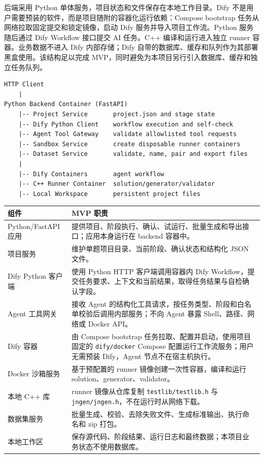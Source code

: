 \documentclass[UTF8,zihao=-4]{ctexart}
\begin{document}
后端采用 Python 单体服务，项目状态和文件保存在本地工作目录。Dify 不是用户需要预装的软件，而是项目随附的容器化运行依赖：Compose bootstrap 任务从网络拉取固定提交和锁定镜像，启动 Dify 服务并导入项目工作流。Python 服务随后通过 Dify Workflow 接口提交 AI 任务。C++ 编译和运行进入独立 runner 容器。业务数据不进入 Dify 内部存储；Dify 自带的数据库、缓存和队列作为其部署黑盒使用。该结构足以完成 MVP，同时避免为本项目另行引入数据库、缓存和独立任务队列。

\begin{lstlisting}
HTTP Client
    |
Python Backend Container (FastAPI)
    |-- Project Service       project.json and stage state
    |-- Dify Python Client    workflow execution and self-check
    |-- Agent Tool Gateway    validate allowlisted tool requests
    |-- Sandbox Service       create disposable runner containers
    |-- Dataset Service       validate, name, pair and export files
    |
    |-- Dify Containers       agent workflow
    |-- C++ Runner Container  solution/generator/validator
    |-- Local Workspace       persistent project files
\end{lstlisting}

\begin{longtable}{p{3.6cm}p{10.2cm}}
\toprule
组件 & MVP 职责 \\
\midrule
Python/FastAPI 应用 & 提供项目、阶段执行、确认、试运行、批量生成和导出接口；应用本身运行在 backend 容器中。 \\
项目服务 & 维护单题项目目录、当前阶段、确认状态和结构化 JSON 文件。 \\
Dify Python 客户端 & 使用 Python HTTP 客户端调用容器内 Dify Workflow，提交任务要求、上下文和当前结果，取得任务结果与自检确认字段。 \\
Agent 工具网关 & 接收 Agent 的结构化工具请求，按任务类型、阶段和白名单校验后调用内部服务；不向 Agent 暴露 Shell、路径、网络或 Docker API。 \\
Dify 容器 & 由 Compose bootstrap 任务拉取、配置并启动，使用项目固定的 \texttt{dify/docker} Compose 配置运行工作流服务；用户无需预装 Dify，Agent 节点不在宿主机执行。 \\
Docker 沙箱服务 & 基于预配置的 runner 镜像创建一次性容器，编译和运行 solution、generator、validator。 \\
本地 C++ 库 & runner 镜像从仓库复制 \texttt{testlib/testlib.h} 与 \texttt{jngen/jngen.h}，不在运行时从网络下载。 \\
数据集服务 & 批量生成、校验、去除失败文件、生成标准输出、执行命名和 zip 打包。 \\
本地工作区 & 保存源代码、阶段结果、运行日志和最终数据；本项目业务状态不使用数据库。 \\
\bottomrule
\end{longtable}
\end{document}
